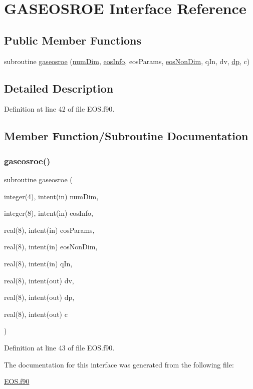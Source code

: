 \hypertarget{interfaceeos_1_1GASEOSROE}{}\section{G\+A\+S\+E\+O\+S\+R\+OE Interface Reference}
\label{interfaceeos_1_1GASEOSROE}
\subsection*{Public Member Functions}
\begin{DoxyCompactItemize}
\item 
subroutine \hyperlink{interfaceeos_1_1GASEOSROE_a23d320940d8372cfb5fbc866cfea0332}{gaseosroe} (\hyperlink{SATKernels_8H_a680185db8546de161968dabace9e94f1}{num\+Dim}, \hyperlink{WENOKernels_8H_a9b67b225dd1b2bffc0623aa04a80bfc4}{eos\+Info}, eos\+Params, \hyperlink{WENOKernels_8H_ae84c458d3f8dce53d214eabcdc84b623}{eos\+Non\+Dim}, q\+In, dv, \hyperlink{RoeKernels_8H_ac12401cc24ddbf8b003a0e6201826e90}{dp}, c)
\end{DoxyCompactItemize}


\subsection{Detailed Description}


Definition at line 42 of file E\+O\+S.\+f90.



\subsection{Member Function/\+Subroutine Documentation}
\hypertarget{interfaceeos_1_1GASEOSROE_a23d320940d8372cfb5fbc866cfea0332}{}\label{interfaceeos_1_1GASEOSROE_a23d320940d8372cfb5fbc866cfea0332} 
\subsubsection{\texorpdfstring{gaseosroe()}{gaseosroe()}}
{\footnotesize\ttfamily subroutine gaseosroe (\begin{DoxyParamCaption}\item[{integer(4), intent(in)}]{num\+Dim,  }\item[{integer(8), intent(in)}]{eos\+Info,  }\item[{real(8), intent(in)}]{eos\+Params,  }\item[{real(8), intent(in)}]{eos\+Non\+Dim,  }\item[{real(8), intent(in)}]{q\+In,  }\item[{real(8), intent(out)}]{dv,  }\item[{real(8), intent(out)}]{dp,  }\item[{real(8), intent(out)}]{c }\end{DoxyParamCaption})}



Definition at line 43 of file E\+O\+S.\+f90.



The documentation for this interface was generated from the following file\+:\begin{DoxyCompactItemize}
\item 
\hyperlink{EOS_8f90}{E\+O\+S.\+f90}\end{DoxyCompactItemize}
